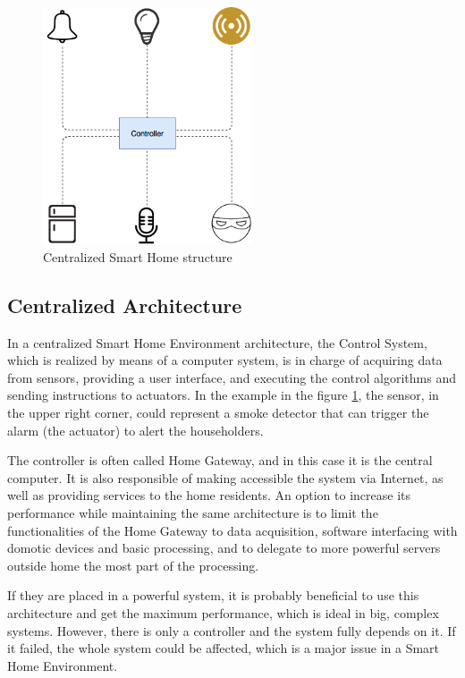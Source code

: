 \begin{figure}
	\centering
	\includegraphics[width=0.55\textwidth]{images/Chapter_02/basic-sh-structure.png}
	\caption{Centralized Smart Home structure}
	\label{fig:sh-basic-structure}
\end{figure}

\subsection{Centralized Architecture}
In a centralized Smart Home Environment architecture, the Control System, which is realized by means of a computer
system, is in charge of acquiring data from sensors, providing a user interface, and executing the control algorithms and 
sending instructions to actuators.\cite{badica13} In the example in the figure \ref{fig:sh-basic-structure}, the sensor, in the
upper right corner, could represent a smoke detector that can trigger the alarm (the actuator) to alert the householders.

\bigskip
The controller is often called Home Gateway, and in this case it is the central computer. It is also responsible of making 
accessible the system via Internet, as well as providing services to the home residents. An option to increase its performance 
while maintaining the same architecture is to limit the functionalities of the Home Gateway to data acquisition, software 
interfacing with domotic devices and basic processing, and to delegate to more powerful servers outside home the most
part of the processing.

\bigskip
If they are placed in a powerful system, it is probably beneficial to use this architecture and get the maximum performance,
which is ideal in big, complex systems.\cite{raulCarreteroElegir} However, there is only a controller and the system fully depends
on it. If it failed, the whole system could be affected, which is a major issue in a Smart Home Environment.


